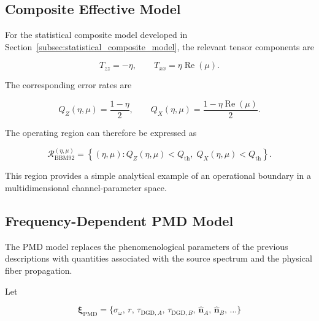 
\subsection{Composite Effective Model}
\label{subsec:bbm92_region_composite}

For the statistical composite model developed in
Section~\ref{subsec:statistical_composite_model}, the relevant tensor components
are

\begin{equation}
T_{zz}
=
-\eta,
\qquad
T_{xx}
=
\eta\operatorname{Re}(\mu).
\end{equation}

The corresponding error rates are

\begin{equation}
Q_Z(\eta,\mu)
=
\frac{1-\eta}{2},
\qquad
Q_X(\eta,\mu)
=
\frac{
1-\eta\operatorname{Re}(\mu)
}{2}.
\label{eq:bbm92_qber_composite_model}
\end{equation}

The operating region can therefore be expressed as

\begin{equation}
\boxed{
\mathcal{R}_{\mathrm{BBM92}}^{(\eta,\mu)}
=
\left\{
(\eta,\mu):
Q_Z(\eta,\mu)<Q_{\mathrm{th}},
\;
Q_X(\eta,\mu)<Q_{\mathrm{th}}
\right\}.
}
\label{eq:bbm92_region_composite_model}
\end{equation}

This region provides a simple analytical example of an operational boundary in a
multidimensional channel-parameter space.


\subsection{Frequency-Dependent PMD Model}
\label{subsec:bbm92_region_pmd}

The PMD model replaces the phenomenological parameters of the previous
descriptions with quantities associated with the source spectrum and the physical
fiber propagation.

Let

\begin{equation}
\boldsymbol{\xi}_{\mathrm{PMD}}
=
\{
\sigma_\omega,\,
r,\,
\tau_{\mathrm{DGD},A},\,
\tau_{\mathrm{DGD},B},\,
\hat{\mathbf n}_A,\,
\hat{\mathbf n}_B,\,
\ldots
\}
\label{eq:pmd_physical_parameter_vector}
\end{equation}

